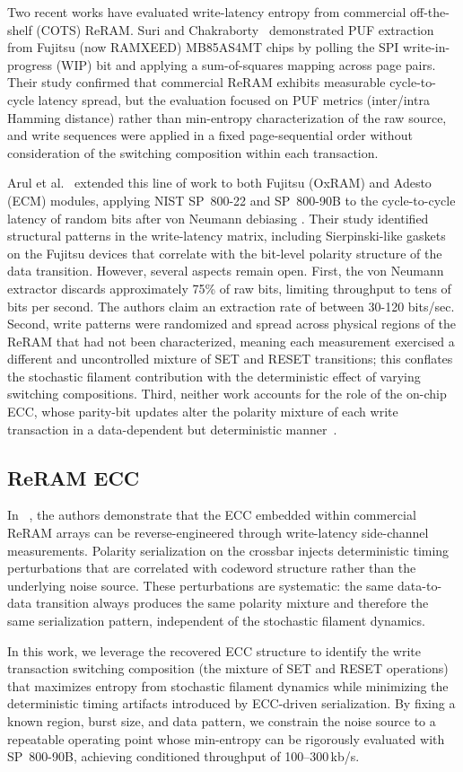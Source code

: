 Two recent works have evaluated write-latency entropy from commercial off-the-shelf (COTS) ReRAM.  Suri and Chakraborty~\cite{suri2018high} demonstrated PUF extraction from Fujitsu (now RAMXEED) MB85AS4MT chips by polling the SPI write-in-progress (WIP) bit and applying a sum-of-squares mapping across page pairs.  Their study confirmed that commercial ReRAM exhibits measurable cycle-to-cycle latency spread, but the evaluation focused on PUF metrics (inter/intra Hamming distance) rather than min-entropy characterization of the raw source, and write sequences were applied in a fixed page-sequential order without consideration of the switching composition within each transaction.

Arul et al.~\cite{tolga2024trng} extended this line of work to both Fujitsu (OxRAM) and Adesto (ECM) modules, applying NIST SP~800-22 and SP~800-90B to the cycle-to-cycle latency of random bits after von Neumann debiasing \cite{von1963various}. Their study identified structural patterns in the write-latency matrix, including Sierpinski-like gaskets on the Fujitsu devices that correlate with the bit-level polarity structure of the data transition. However, several aspects remain open. First, the von Neumann extractor discards approximately 75\% of raw bits, limiting throughput to tens of bits per second. The authors claim an extraction rate of between 30-120 bits/sec. Second, write patterns were randomized and spread across physical regions of the ReRAM that had not been characterized, meaning each measurement exercised a different and uncontrolled mixture of SET and RESET transitions; this conflates the stochastic filament contribution with the deterministic effect of varying switching compositions. Third, neither work accounts for the role of the on-chip ECC, whose parity-bit updates alter the polarity mixture of each write transaction in a data-dependent but deterministic manner~\cite{sheaves2026brewrc}.

\subsection{ReRAM ECC}
In ~\cite{sheaves2026brewrc}, the authors demonstrate that the ECC embedded within commercial ReRAM arrays can be reverse-engineered through write-latency side-channel measurements. Polarity serialization on the crossbar injects deterministic timing perturbations that are correlated with codeword structure rather than the underlying noise source. These perturbations are systematic: the same data-to-data transition always produces the same polarity mixture and therefore the same serialization pattern, independent of the stochastic filament dynamics.

In this work, we leverage the recovered ECC structure to identify the write transaction switching composition (the mixture of SET and RESET operations) that maximizes entropy from stochastic filament dynamics while minimizing the deterministic timing artifacts introduced by ECC-driven serialization. By fixing a known region, burst size, and data pattern, we constrain the noise source to a repeatable operating point whose min-entropy can be rigorously evaluated with SP~800-90B, achieving conditioned throughput of 100--300\,kb/s.